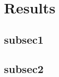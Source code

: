 \section{Results}\label{sec_results}


\subsection{subsec1}


\subsection{subsec2}\label{results_subsec2}




 



